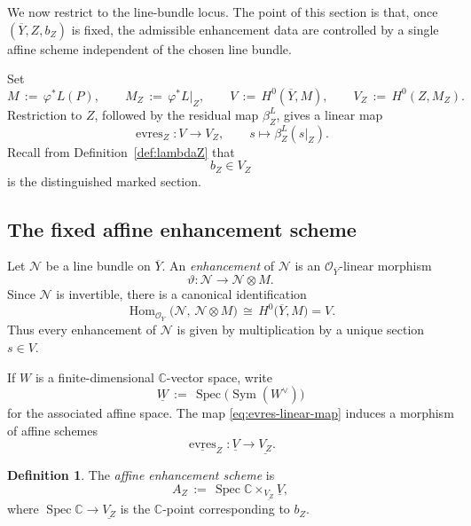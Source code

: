 \documentclass[a4paper,12pt]{amsart}
\numberwithin{equation}{section}
\theoremstyle{definition}
\newtheorem{definition}[theorem]{Definition}
\newcommand{\OO}{\mathcal{O}}
\newcommand{\Hom}{\operatorname{Hom}}
\newcommand{\Spec}{\operatorname{Spec}}
\newcommand{\Sym}{\operatorname{Sym}}
\newcommand{\evres}{\operatorname{evres}}
\newcommand{\CC}{\mathbb C}
\begin{document}
We now restrict to the line-bundle locus.  The point of this section is that, once \((\overline{Y},Z,b_Z)\) is fixed, the admissible enhancement data are controlled by a single affine scheme independent of the chosen line bundle.

Set
\[
M\,:=\,\varphi^*L(P),
\qquad
M_Z\,:=\,\varphi^*L|_Z,
\qquad
V\,:=\,H^0(\overline{Y},M),
\qquad
V_Z\,:=\,H^0(Z,M_Z).
\]
Restriction to \(Z\), followed by the residual map \(\beta_Z^L\), gives a linear map
\begin{equation}\label{eq:evres-linear-map}
\evres_Z:V\longrightarrow V_Z,
\qquad
s\longmapsto \beta_Z^L(s|_Z).
\end{equation}
Recall from Definition~\ref{def:lambdaZ} that
\[
b_Z\in V_Z
\]
is the distinguished marked section.

\subsection{The fixed affine enhancement scheme}

Let \(\mathcal N\) be a line bundle on \(\overline{Y}\).  An \emph{enhancement} of \(\mathcal N\) is an \(\OO_{\overline{Y}}\)-linear morphism
\[
\vartheta:\mathcal N\longrightarrow \mathcal N\otimes M.
\]
Since \(\mathcal N\) is invertible, there is a canonical identification
\begin{equation}\label{eq:Hom-sections-linebundle-new}
\Hom_{\OO_{\overline{Y}}}\!\bigl(\mathcal N,\,\mathcal N\otimes M\bigr)
\,\cong\,
H^0\!\bigl(\overline{Y},M\bigr)=V.
\end{equation}
Thus every enhancement of \(\mathcal N\) is given by multiplication by a unique section \(s\in V\).

If \(W\) is a finite-dimensional \(\CC\)-vector space, write
\[
\underline{W}\,:=\,\Spec\bigl(\Sym(W^\vee)\bigr)
\]
for the associated affine space.  The map \eqref{eq:evres-linear-map} induces a morphism of affine schemes
\[
\underline{\evres}_Z:\underline{V}\longrightarrow \underline{V_Z}.
\]

\begin{definition}\label{def:fixed-affine-scheme}
The \emph{affine enhancement scheme} is
\begin{equation}\label{eq:A-Delta-scheme}
A_Z
\,:=\,
\Spec\CC\times_{\underline{V_Z}}\underline{V},
\end{equation}
where \(\Spec\CC\longrightarrow \underline{V_Z}\) is the \(\CC\)-point corresponding to \(b_Z\).
\end{definition}
\end{document}

